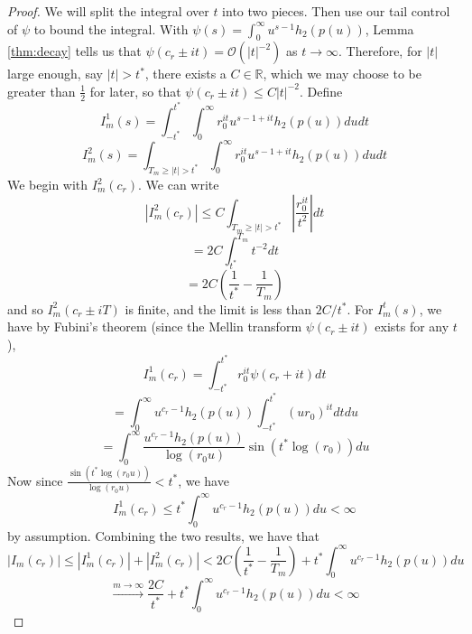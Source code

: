 \documentclass{article}
\newcommand{\tti}{\rightarrow\infty}
\newcommand{\bigO}[1]{\mathcal{O}\left(#1\right)}
\begin{document}
\begin{proof}
    We will split the integral over $t$ into two pieces. Then use our tail control of $\psi$ to bound the integral. With $\psi(s)=\int_0^\infty u^{s-1}h_2(p(u))$, Lemma \ref{thm:decay} tells us that $\psi(c_r\pm it) = \bigO{|t|^{-2}}$ as $t\tti$. Therefore, for $|t|$ large enough, say $|t| > t^*$, 
    there exists a $C \in \mathbb{R}$, which we may choose to be greater than $\frac{1}{2}$ for later, so that $\psi(c_r\pm it) \leq C|t|^{-2}$.
    Define
    \begin{equation}
        I_m^1(s) = \int_{-t^*}^{t^*}\int_0^\infty r_0^{it}u^{s-1+it}h_2(p(u))dudt
    \end{equation}
    \begin{equation}
        I_m^2(s)=\int_{T_m \geq |t|>t^*}\int_0^\infty r_0^{it}u^{s-1+it}h_2(p(u))dudt
    \end{equation}
    We begin with $I_m^2(c_r)$. We can write
    \begin{equation}
        |I_m^2(c_r)| \leq C\int_{T_m \geq |t|>t^*} \left|\frac{r_0^{it}}{t^2}\right|dt
    \end{equation}
    \begin{equation}
     = 2C\int_{t^*}^{T_m}t^{-2}dt
    \end{equation}
    \begin{equation}
        = 2C\left(\frac{1}{t^*}-\frac{1}{T_m}\right) 
    \end{equation}
    and so $I_m^2(c_r\pm iT)$ is finite, and the limit is less than $2C/t^*$. For $I_m^t(s)$, we have by Fubini's theorem (since the Mellin transform $\psi(c_r\pm it)$ exists for any $t$), 
    \begin{equation}
        I_m^1(c_r) = \int_{-t^*}^{t^*}r_0^{it}\psi(c_r+it)dt
    \end{equation}
    \begin{equation}
        = \int_0^{\infty} u^{c_r-1}h_2(p(u))\int_{-t^*}^{t^*} (ur_0)^{it}dtdu
    \end{equation}
    \begin{equation}
        = \int_0^{\infty}\frac{u^{c_r-1}h_2(p(u))}{\log(r_0u)} \sin(t^*\log (r_0))du
    \end{equation}
    Now since $\frac{\sin(t^*\log(r_0u))}{\log(r_0u)} < t^*$, we have
    \begin{equation}
        I_m^1(c_r) \leq {t^*} \int_{0}^{\infty} u^{c_r-1}h_2(p(u))du < \infty
    \end{equation}
    by assumption. Combining the two results, we have that
    \begin{equation}
        |I_m(c_r)| \leq |I_m^1(c_r)| + |I_m^2(c_r)| < 2C\left(\frac{1}{t^*} - \frac{1}{T_m}\right) + t^*\int_0^{\infty}u^{c_r-1}h_2(p(u))du
    \end{equation}
    \begin{equation}
        \overset{m\tti}{\to}\frac{2C}{t^*}+{t^*}\int_0^{\infty}u^{c_r-1}h_2(p(u))du < \infty
    \end{equation}
\end{proof}
\end{document}

